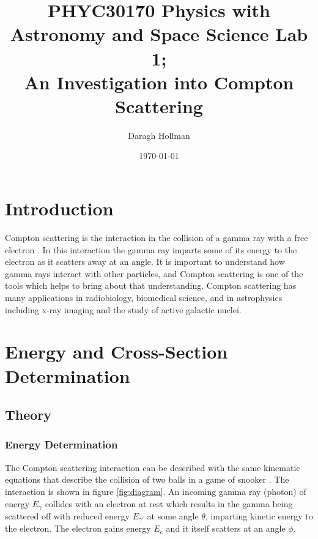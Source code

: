 \documentclass[%
reprint,
amsmath,amssymb,
aps,
]{revtex4-2}
\begin{document}
	
	
	\title{PHYC30170 Physics with Astronomy and Space Science Lab 1;\\An Investigation into Compton Scattering}
	
	\author{Daragh Hollman}
	
	\date{\today}
	
	\begin{abstract}

	\end{abstract}

	\maketitle
	
	\section{Introduction}
	Compton scattering is the interaction in the collision of a gamma ray with a free electron \cite{manual1}. In this interaction the gamma ray imparts some of its energy to the electron as it scatters away at an angle. It is important to understand how gamma rays interact with other particles, and Compton scattering is one of the tools which helps to bring about that understanding. Compton scattering has many applications in radiobiology, biomedical science, and in astrophysics \cite{KURODA2011S183}\cite{harding}\cite{alessia} including x-ray imaging and the study of active galactic nuclei.
	
	\section{Energy and Cross-Section Determination}
	
		\subsection{Theory}
		
			\subsubsection{Energy Determination}		
			The Compton scattering interaction can be described with the same kinematic equations that describe the collision of two balls in a game of snooker \cite{manual1}. The interaction is shown in figure \ref{fig:diagram}. An incoming gamma ray (photon) of energy $E_\gamma$ collides with an electron at rest which results in the gamma being scattered off with reduced energy $E_{\gamma'}$ at some angle $\theta$, imparting kinetic energy to the electron. The electron gains energy $E_e$ and it itself scatters at an angle $\phi$.\\
			
\end{document}

